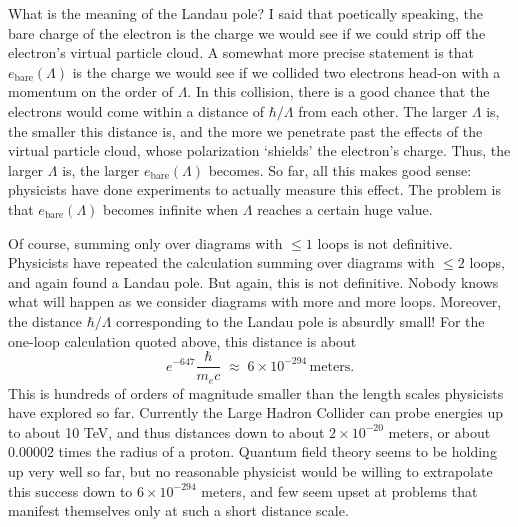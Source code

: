 \documentclass[12pt]{article}
\newcommand{\bare}{\mathrm{bare}}
\begin{document}
What is the meaning of the Landau pole?  I said that poetically speaking, the bare charge of the electron is the charge we would see if we could strip off the electron's virtual particle cloud.  A somewhat more precise statement is that $e_\bare(\Lambda)$ is the charge we would see if we collided two electrons head-on with a momentum on the order of $\Lambda$.  In this collision, there is a good chance that the electrons would come within a distance of $\hbar/\Lambda$ from each other.  The larger $\Lambda$ is, the smaller this distance is, and the more we penetrate past the effects of the virtual particle cloud, whose polarization `shields' the electron's charge. Thus, the larger $\Lambda$ is, the larger $e_\bare(\Lambda)$ becomes.  So far, all this makes good sense: physicists have done experiments to actually measure this effect.  The problem is that $e_\bare(\Lambda)$ becomes infinite when $\Lambda$ reaches a certain huge value. 

Of course, summing only over diagrams with $\le 1$ loops is not definitive.  Physicists have repeated the calculation summing over diagrams with $\le 2$ loops, and again found a Landau pole.  But again, this is not definitive.  Nobody knows what will happen as we consider diagrams with more and more loops.  Moreover, the distance $\hbar/\Lambda$ corresponding to the Landau pole is absurdly small!  For the one-loop calculation quoted above, 
this distance is about 
\[       e^{-647} \frac{\hbar}{m_e c} \; \approx \;  6 \times 10^{-294}\, \mathrm{meters} .\]
This is hundreds of orders of magnitude smaller than the length scales physicists have explored so far.  Currently the Large Hadron Collider can probe energies up to about 10 TeV, and thus distances down to about $2 \times 10^{-20}$ meters, or about 0.00002 times the radius of a proton.  Quantum field theory seems to be holding up very well so far, but no reasonable physicist would be willing to extrapolate this success down to $6 \times 10^{-294}$ meters, and few seem upset at problems that manifest themselves only at such a short distance scale.  
\end{document}
